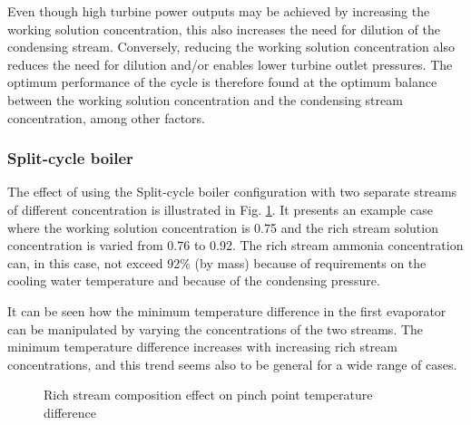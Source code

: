 \documentclass[review,3p]{elsarticle}
\begin{document}
Even though high turbine power outputs may be achieved by increasing the working solution concentration, this also increases the need for dilution of the condensing stream. Conversely, reducing the working solution concentration also reduces the need for dilution and/or enables lower turbine outlet pressures. The optimum performance of the cycle is therefore found at the optimum balance between the working solution concentration and the condensing stream concentration, among other factors. 



\subsubsection{Split-cycle boiler}
\label{subsec:SCBoiler}
The effect of using the Split-cycle boiler configuration with two separate streams of different concentration is illustrated in Fig. \ref{fig:dTmin}. It presents an example case where the working solution concentration is 0.75 and the rich stream solution concentration is varied from 0.76 to 0.92. The rich stream ammonia concentration can, in this case, not exceed 92\% (by mass) because of requirements on the cooling water temperature and because of the condensing pressure.

It can be seen how the minimum temperature difference in the first evaporator can be manipulated by varying the concentrations of the two streams. The minimum temperature difference increases with increasing rich stream concentrations, and this trend seems also to be general for a wide range of cases. 




\begin{figure}[htpb]
\centering
{}

\caption{Rich stream composition effect on pinch point temperature difference}
\label{fig:dTmin}
\end{figure}
\end{document}
